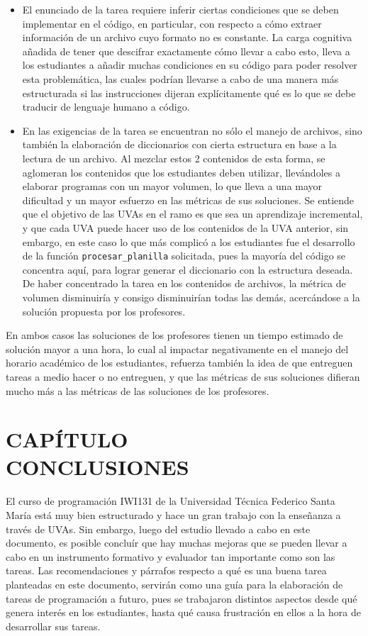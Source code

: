 \documentclass[letterpaper,12pt]{article}
\newcommand{\secnumbersection}[1]{
\addtocounter{section}{1}
\section*{CAPÍTULO \thesection \texorpdfstring{\\}\ #1}
\addcontentsline{toc}{section}{CAPÍTULO \thesection : #1}
\setcounter{subsection}{0}
}
\begin{document}
\begin{itemize}
  \item El enunciado de la tarea requiere inferir ciertas condiciones que se deben implementar en el código, en particular, con respecto a cómo extraer información de un archivo cuyo formato no es constante. La carga cognitiva añadida de tener que descifrar exactamente cómo llevar a cabo esto, lleva a los estudiantes a añadir muchas condiciones en su código para poder resolver esta problemática, las cuales podrían llevarse a cabo de una manera más estructurada si las instrucciones dijeran explícitamente qué es lo que se debe traducir de lenguaje humano a código.
  \item En las exigencias de la tarea se encuentran no sólo el manejo de archivos, sino también la elaboración de diccionarios con cierta estructura en base a la lectura de un archivo. Al mezclar estos 2 contenidos de esta forma, se aglomeran los contenidos que los estudiantes deben utilizar, llevándoles a elaborar programas con un mayor volumen, lo que lleva a una mayor dificultad y un mayor esfuerzo en las métricas de sus soluciones. Se entiende que el objetivo de las UVAs en el ramo es que sea un aprendizaje incremental, y que cada UVA puede hacer uso de los contenidos de la UVA anterior, sin embargo, en este caso lo que más complicó a los estudiantes fue el desarrollo de la función \texttt{procesar\_planilla} solicitada, pues la mayoría del código se concentra aquí, para lograr generar el diccionario con la estructura deseada. De haber concentrado la tarea en los contenidos de archivos, la métrica de volumen disminuiría y consigo disminuirían todas las demás, acercándose a la solución propuesta por los profesores.
\end{itemize}

En ambos casos las soluciones de los profesores tienen un tiempo estimado de solución mayor a una hora, lo cual al impactar negativamente en el manejo del horario académico de los estudiantes, refuerza también la idea de que entreguen tareas a medio hacer o no entreguen, y que las métricas de sus soluciones difieran mucho más a las métricas de las soluciones de los profesores.

\newpage

\secnumbersection{CONCLUSIONES} \label{sec:conclusiones}

El curso de programación IWI131 de la Universidad Técnica Federico Santa María está muy bien estructurado y hace un gran trabajo con la enseñanza a través de UVAs. Sin embargo, luego del estudio llevado a cabo en este documento, es posible concluír que hay muchas mejoras que se pueden llevar a cabo en un instrumento formativo y evaluador tan importante como son las tareas. Las recomendaciones y párrafos respecto a qué es una buena tarea planteadas en este documento, servirán como una guía para la elaboración de tareas de programación a futuro, pues se trabajaron distintos aspectos desde qué genera interés en los estudiantes, hasta qué causa frustración en ellos a la hora de desarrollar sus tareas.
\end{document}
